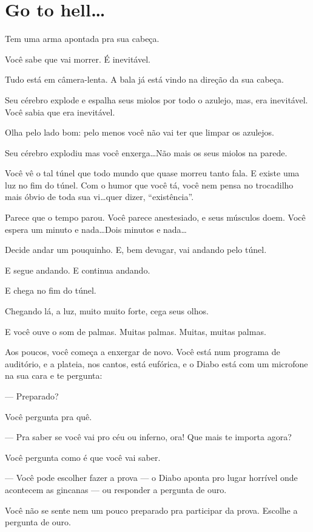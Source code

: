 \chapter{Go to hell\ldots}

Tem uma arma apontada pra sua cabeça.

Você sabe que vai morrer. É inevitável.

Tudo está em câmera-lenta. A bala já está vindo na direção da sua cabeça.

Seu cérebro explode e espalha seus miolos por todo o azulejo, mas, era inevitável. Você sabia que era inevitável.

Olha pelo lado bom: pelo menos você não vai ter que limpar os azulejos.

Seu cérebro explodiu mas você enxerga\ldots Não mais os seus miolos na parede.

Você vê o tal túnel que todo mundo que quase morreu tanto fala. E existe uma luz no fim do túnel. Com o humor que você tá, você nem pensa no trocadilho mais óbvio de toda sua vi\ldots quer dizer, ``existência''.

Parece que o tempo parou. Você parece anestesiado, e seus músculos doem. Você espera um minuto e nada\ldots Dois minutos e nada\ldots

Decide andar um pouquinho. E, bem devagar, vai andando pelo túnel.

E segue andando. E continua andando.

E chega no fim do túnel.

Chegando lá, a luz, muito muito forte, cega seus olhos.

E você ouve o som de palmas. Muitas palmas. Muitas, muitas palmas.

Aos poucos, você começa a enxergar de novo. Você está num programa de auditório, e a plateia, nos cantos, está eufórica, e o Diabo está com um microfone na sua cara e te pergunta:

--- Preparado?

Você pergunta pra quê.

--- Pra saber se você vai pro céu ou inferno, ora! Que mais te importa agora?

Você pergunta como é que você vai saber.

--- Você pode escolher fazer a prova --- o Diabo aponta pro lugar horrível onde acontecem as gincanas --- ou responder a pergunta de ouro.

Você não se sente nem um pouco preparado pra participar da prova. Escolhe a pergunta de ouro.

